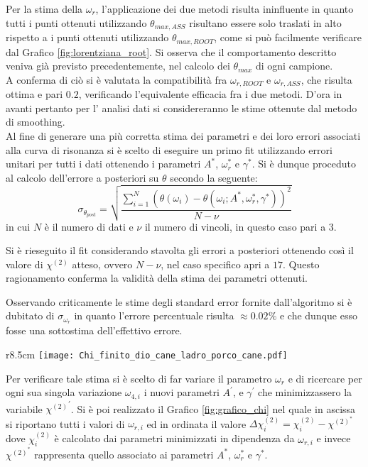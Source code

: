 \documentclass[a4paper,11pt,oneside]{article}
\begin{document}
Per la stima della $\omega_{r}$, l'applicazione dei due metodi risulta ininfluente in quanto tutti i punti ottenuti utilizzando  $\theta_ {max, ASS}$ risultano essere solo traslati in alto rispetto a i punti ottenuti utilizzando  $\theta_{max, ROOT}$, come si può facilmente verificare dal Grafico \ref{fig:lorentziana_root}. Si osserva che il comportamento descritto veniva già previsto precedentemente, nel calcolo dei $\theta_{max}$ di ogni campione.\\
A conferma di ciò si è valutata la compatibilità fra $\omega_{r, ROOT}$ e $\omega_{r, ASS}$, che risulta ottima e pari $0.2$, verificando l'equivalente efficacia fra i due metodi. 
D'ora in avanti pertanto per l' analisi dati si considereranno le stime ottenute dal metodo di smoothing.\\

Al fine di generare una più corretta stima dei parametri e dei loro errori associati alla curva di risonanza si è scelto di eseguire un primo fit utilizzando errori unitari per tutti i dati ottenendo i parametri $A^{\ast}$, $\omega_{r}^{\ast}$ e $\gamma^{\ast}$. Si è dunque proceduto al calcolo dell'errore a posteriori su $\theta$ secondo la seguente:
\begin{equation*}
    \sigma_{\theta_{post}}=\sqrt{\frac{\sum_{i=1}^{N} (\theta(\omega_{i})-\theta(\omega_{i} ; A^{\ast}, \omega_{r}^{\ast}, \gamma^{\ast}))^{2}}{N-\nu}}
\end{equation*}
in cui $N$ è il numero di dati e $\nu$ il numero di vincoli, in questo caso pari a $3$.

Si è rieseguito il fit considerando stavolta gli errori a posteriori ottenendo così il valore di $\chi^{(2)}$ atteso, ovvero $N-\nu$, nel caso specifico apri a $17$. Questo ragionamento conferma la validità della stima dei parametri ottenuti. 

Osservando criticamente le stime degli standard error fornite dall'algoritmo si è dubitato di $\sigma_{\omega_{r}}$ in quanto l'errore percentuale risulta $\approx 0.02 \%$ e che dunque esso fosse una sottostima dell'effettivo errore.\\
\begin{wrapfigure}{r}{8.5cm}
    \vspace{-0.5cm}
    \centering
    \texttt{[image: Chi\_finito\_dio\_cane\_ladro\_porco\_cane.pdf]}
    \caption{Grafico \chi^2}
    \label{fig:grafico_chi}
    \vspace{-10pt}
\end{wrapfigure}
Per verificare tale stima si è scelto di far variare il parametro $\omega_r$ e di ricercare per ogni sua singola variazione $\omega_{4, i}$ i nuovi parametri $A^{'}$, e $\gamma^{'}$ che minimizzassero la variabile ${\chi^{(2)}}^{'}$. Si è poi realizzato il Grafico \ref{fig:grafico_chi} nel quale in ascissa si riportano tutti i valori di $\omega_{r, i}$ ed in ordinata il valore $\Delta\chi^{(2)}_{i}=\chi^{(2)}_{i}-\chi^{(2)}^{\ast}$ dove $\chi^{(2)}_{i}$ è calcolato dai parametri minimizzati in dipendenza da $\omega_{r, i}$ e invece  $\chi^{(2)}^{\ast}$  rappresenta quello associato ai parametri $A^{\ast}$, $\omega_{r}^{\ast}$ e $\gamma^{\ast}$.
\end{document}

